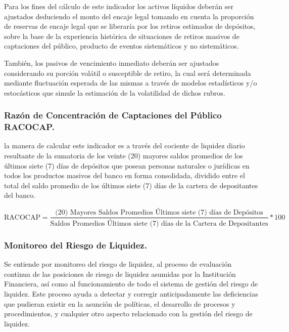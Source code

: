 \documentclass[]{article}
\begin{document}
Para los fines del cálculo de este indicador los activos líquidos
deberán ser ajustados deduciendo el monto del encaje legal tomando en
cuenta la proporción de reservas de encaje legal que se liberaría por
los retiros estimados de depósitos, sobre la base de la experiencia
histórica de situaciones de retiros masivos de captaciones del público,
producto de eventos sistemáticos y no sistemáticos.

También, los pasivos de vencimiento inmediato deberán ser ajustados
considerando su porción volátil o susceptible de retiro, la cual será
determinada mediante fluctuación esperada de las mismas a través de
modelos estadísticos y/o estocásticos que simule la estimación de la
volatilidad de dichos rubros.

\hypertarget{razon-de-concentracion-de-captaciones-del-publico-racocap.}{%
\subsubsection{\texorpdfstring{\textbf{Razón de Concentración de
Captaciones del Público}
RACOCAP.}{Razón de Concentración de Captaciones del Público RACOCAP.}}\label{razon-de-concentracion-de-captaciones-del-publico-racocap.}}

la manera de calcular este indicador es a través del cociente de
liquidez diario resultante de la sumatoria de los veinte (20) mayores
saldos promedios de los últimos siete (7) días de depósitos que posean
personas naturales o jurídicas en todos los productos masivos del banco
en forma consolidada, dividido entre el total del saldo promedio de los
últimos siete (7) días de la cartera de depositantes del banco.

\[\text{RACOCAP} = \frac{\text{(20) Mayores Saldos Promedios Últimos siete (7) días de Depósitos}}{\text{Saldos Promedios Últimos siete (7) días de la Cartera de Depositantes}}*100\]

\hypertarget{monitoreo-del-riesgo-de-liquidez.}{%
\subsubsection{Monitoreo del Riesgo de
Liquidez.}\label{monitoreo-del-riesgo-de-liquidez.}}

Se entiende por monitoreo del riesgo de liquidez, al proceso de
evaluación continua de las posiciones de riesgo de liquidez asumidas por
la Institución Financiera, así como al funcionamiento de todo el sistema
de gestión del riesgo de liquidez. Este proceso ayuda a detectar y
corregir anticipadamente las deficiencias que pudieran existir en la
asunción de políticas, el desarrollo de procesos y procedimientos, y
cualquier otro aspecto relacionado con la gestión del riesgo de
liquidez.
\end{document}
